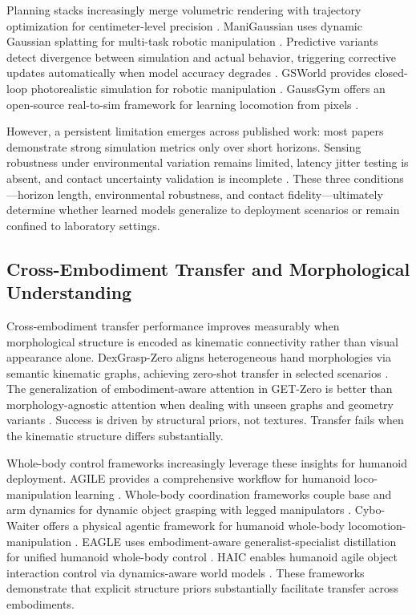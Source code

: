 \documentclass[12pt,a4paper,oneside]{report}
\begin{document}
Planning stacks increasingly merge volumetric rendering with trajectory optimization for centimeter-level precision \cite{sun2026digitaltwin}. ManiGaussian uses dynamic Gaussian splatting for multi-task robotic manipulation \cite{lu2024manigaussian}. Predictive variants detect divergence between simulation and actual behavior, triggering corrective updates automatically when model accuracy degrades \cite{pan2025selfcorrecting}. GSWorld provides closed-loop photorealistic simulation for robotic manipulation \cite{jiang2025gsworld}. GaussGym offers an open-source real-to-sim framework for learning locomotion from pixels \cite{escontrela2025gaussgym}.

However, a persistent limitation emerges across published work: most papers demonstrate strong simulation metrics only over short horizons. Sensing robustness under environmental variation remains limited, latency jitter testing is absent, and contact uncertainty validation is incomplete \cite{lou2024robogs, pan2025selfcorrecting}. These three conditions—horizon length, environmental robustness, and contact fidelity—ultimately determine whether learned models generalize to deployment scenarios or remain confined to laboratory settings.

\subsection{Cross-Embodiment Transfer and Morphological Understanding}

Cross-embodiment transfer performance improves measurably when morphological structure is encoded as kinematic connectivity rather than visual appearance alone. DexGrasp-Zero aligns heterogeneous hand morphologies via semantic kinematic graphs, achieving zero-shot transfer in selected scenarios \cite{wu2025dexgrasp}. The generalization of embodiment-aware attention in GET-Zero is better than morphology-agnostic attention when dealing with unseen graphs and geometry variants \cite{patel2024getzero}. Success is driven by structural priors, not textures. Transfer fails when the kinematic structure differs substantially.

Whole-body control frameworks increasingly leverage these insights for humanoid deployment. AGILE provides a comprehensive workflow for humanoid loco-manipulation learning \cite{zhao2026agile}. Whole-body coordination frameworks couple base and arm dynamics for dynamic object grasping with legged manipulators \cite{liang2025wholebody}. Cybo-Waiter offers a physical agentic framework for humanoid whole-body locomotion-manipulation \cite{ren2026cybowaiter}. EAGLE uses embodiment-aware generalist-specialist distillation for unified humanoid whole-body control \cite{peng2026eagle}. HAIC enables humanoid agile object interaction control via dynamics-aware world models \cite{li2026haic}. These frameworks demonstrate that explicit structure priors substantially facilitate transfer across embodiments.
\end{document}
